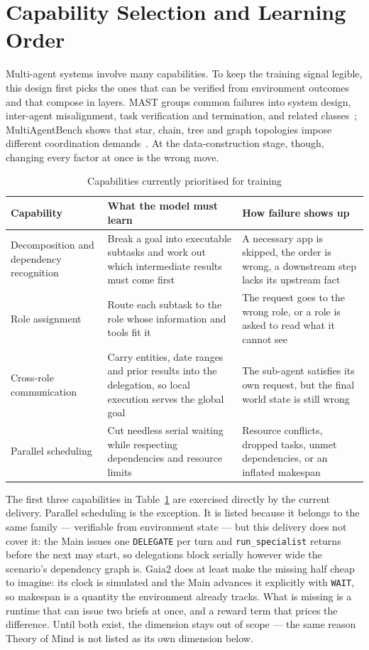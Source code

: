 \documentclass[11pt,a4paper]{article}
\begin{document}
\section{Capability Selection and Learning Order}

Multi-agent systems involve many capabilities. To keep the training signal legible, this design first picks the ones that can be verified from environment outcomes and that compose in layers. MAST groups common failures into system design, inter-agent misalignment, task verification and termination, and related classes~\cite{cemri2025mast}; MultiAgentBench shows that star, chain, tree and graph topologies impose different coordination demands~\cite{zhu2025multiagentbench}. At the data-construction stage, though, changing every factor at once is the wrong move.

\begin{table}[H]
\centering
\small
\caption{Capabilities currently prioritised for training}
\label{tab:capabilities}
\begin{tabularx}{\textwidth}{>{\raggedright\arraybackslash}p{2.9cm} X >{\raggedright\arraybackslash}p{4.3cm}}
\toprule
Capability & What the model must learn & How failure shows up\\
\midrule
Decomposition and dependency recognition & Break a goal into executable subtasks and work out which intermediate results must come first & A necessary app is skipped, the order is wrong, a downstream step lacks its upstream fact\\
Role assignment & Route each subtask to the role whose information and tools fit it & The request goes to the wrong role, or a role is asked to read what it cannot see\\
Cross-role communication & Carry entities, date ranges and prior results into the delegation, so local execution serves the global goal & The sub-agent satisfies its own request, but the final world state is still wrong\\
Parallel scheduling & Cut needless serial waiting while respecting dependencies and resource limits & Resource conflicts, dropped tasks, unmet dependencies, or an inflated makespan\\
\bottomrule
\end{tabularx}
\end{table}

The first three capabilities in Table~\ref{tab:capabilities} are exercised directly by the current delivery. Parallel scheduling is the exception. It is listed because it belongs to the same family --- verifiable from environment state --- but this delivery does not cover it: the Main issues one \texttt{DELEGATE} per turn and \texttt{run\_specialist} returns before the next may start, so delegations block serially however wide the scenario's dependency graph is. Gaia2 does at least make the missing half cheap to imagine: its clock is simulated and the Main advances it explicitly with \texttt{WAIT}, so makespan is a quantity the environment already tracks. What is missing is a runtime that can issue two briefs at once, and a reward term that prices the difference. Until both exist, the dimension stays out of scope --- the same reason Theory of Mind is not listed as its own dimension below.
\end{document}
